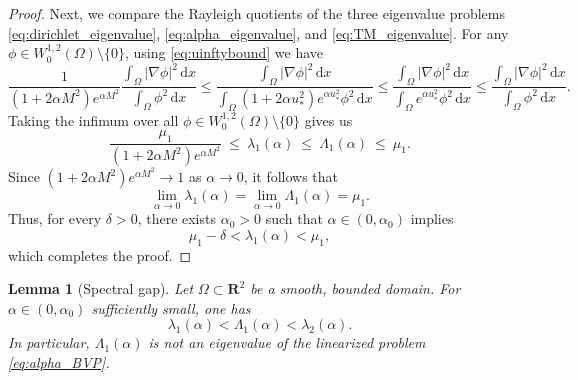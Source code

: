 \documentclass[reqno,11pt]{amsart}
\newtheorem{lemma}[theorem]{Lemma}
\theoremstyle{definition}
\newcommand{\ud}{\,\mathrm{d}}
\begin{document}
\begin{proof}
Next, we compare the Rayleigh quotients of the three eigenvalue problems \eqref{eq:dirichlet_eigenvalue}, \eqref{eq:alpha_eigenvalue}, and \eqref{eq:TM_eigenvalue}.
For any $\phi\in W^{1,2}_0(\Omega)\setminus\{0\}$, using \eqref{eq:uinftybound} we have
\[
\frac{1}{(1 + 2\alpha M^2) e^{\alpha M^2}}
\frac{\int_{\Omega} |\nabla \phi|^2 \ud x}{\int_{\Omega}  \phi^2 \ud x}
\le
\frac{\int_{\Omega} |\nabla \phi|^2 \ud x}{\int_{\Omega} (1 + 2\alpha u_*^2) e^{\alpha u_*^2} \phi^2 \ud x}
\le
\frac{\int_{\Omega} |\nabla \phi|^2 \ud x}{\int_{\Omega} e^{\alpha u_*^2} \phi^2 \ud x}
\le
\frac{\int_{\Omega} |\nabla \phi|^2 \ud x}{\int_{\Omega}  \phi^2 \ud x}.
\]
Taking the infimum over all $\phi\in W^{1,2}_0(\Omega)\setminus\{0\}$ gives us
\[
\frac{\mu_1}{(1 + 2\alpha M^2) e^{\alpha M^2}}
\ \le\
\lambda_1(\alpha)
\ \le\
\Lambda_1(\alpha)
\ \le\
\mu_1.
\]
Since $(1 + 2\alpha M^2) e^{\alpha M^2}\to1$ as $\alpha\to0$, it follows that
\[
\lim_{\alpha\to0}\lambda_1(\alpha)
=\lim_{\alpha\to0}\Lambda_1(\alpha)
=\mu_1.
\]
Thus, for every $\delta>0$, there exists $\alpha_0>0$ such that $\alpha\in(0,\alpha_0)$ implies
\[
\mu_1-\delta<\lambda_1(\alpha)<\mu_1,
\]
which completes the proof.
\end{proof}

\begin{lemma}[Spectral gap]\label{lm:spectral_gap}
    Let $\Omega\subset\mathbf{R}^2$ be a smooth, bounded domain.
    For $\alpha\in(0,\alpha_0)$ sufficiently small, one has
    \[
    \lambda_1(\alpha) < \Lambda_1(\alpha) < \lambda_2(\alpha).
    \]
    In particular, $\Lambda_1(\alpha)$ is not an eigenvalue of the linearized problem \eqref{eq:alpha_BVP}.
\end{lemma}
\end{document}
